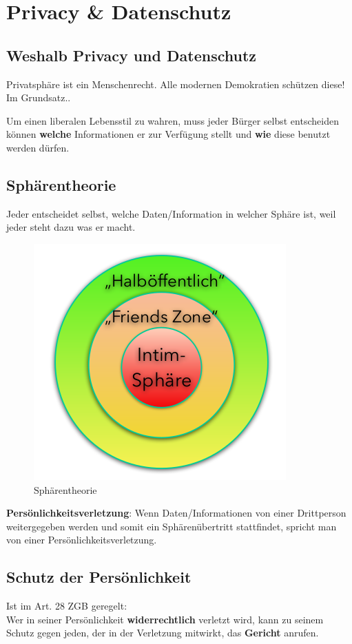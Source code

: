 \section{Privacy \& Datenschutz}

\subsection{Weshalb Privacy und Datenschutz}
Privatsphäre ist ein Menschenrecht. Alle modernen Demokratien schützen
diese! Im Grundsatz..

Um einen liberalen Lebensstil zu wahren, muss jeder Bürger selbst
entscheiden können \textbf{welche} Informationen er zur Verfügung stellt
und \textbf{wie} diese benutzt werden dürfen.


\subsection{Sphärentheorie}
Jeder entscheidet selbst, welche Daten/Information in welcher Sphäre
ist, weil jeder steht dazu was er macht.

\begin{figure}[H]
\centering
\includegraphics[width=.5\textwidth]{figures/sphaerentheorie.png}
\caption{Sphärentheorie}
\end{figure}

\textbf{Persönlichkeitsverletzung}:
Wenn Daten/Informationen von einer
Drittperson weitergegeben werden und somit ein Sphärenübertritt
stattfindet, spricht man von einer Persönlichkeitsverletzung.


\subsection{Schutz der Persönlichkeit}
\label{sec:Datenschutz-SchutzPersönlichkeit}

Ist im Art. 28 ZGB geregelt:\\
Wer in seiner Persönlichkeit \textbf{widerrechtlich} verletzt wird, kann zu
seinem Schutz gegen jeden, der in der Verletzung mitwirkt, das \textbf{Gericht}
anrufen.

